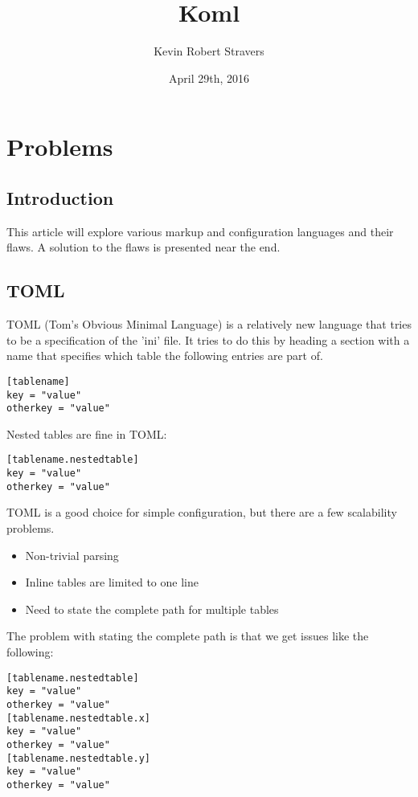 \documentclass[listof=totoc]{article}
\title{Koml}
\author{Kevin Robert Stravers}
\date{April 29th, 2016}
\begin{document}
\maketitle

\iffalse
	\tableofcontents
	\lstlistoflistings
\fi

\chapter{Problems}
\section{Introduction}
This article will explore various markup and configuration languages and their flaws. A solution to the flaws is presented near the end.

\section{TOML}
TOML (Tom's Obvious Minimal Language) is a relatively new language that tries to be a specification of the 'ini' file.
It tries to do this by heading a section with a name that specifies which table the following entries are part of.

\begin{verbatim}
[tablename]
key = "value"
otherkey = "value"
\end{verbatim}

Nested tables are fine in TOML:

\begin{verbatim}
[tablename.nestedtable]
key = "value"
otherkey = "value"
\end{verbatim}

TOML is a good choice for simple configuration, but there are a few scalability problems.

\begin{itemize}
	\item Non-trivial parsing
	\item Inline tables are limited to one line
	\item Need to state the complete path for multiple tables
\end{itemize}

The problem with stating the complete path is that we get issues like the following:

\begin{verbatim}
[tablename.nestedtable]
key = "value"
otherkey = "value"
[tablename.nestedtable.x]
key = "value"
otherkey = "value"
[tablename.nestedtable.y]
key = "value"
otherkey = "value"
\end{verbatim}
\end{document}
